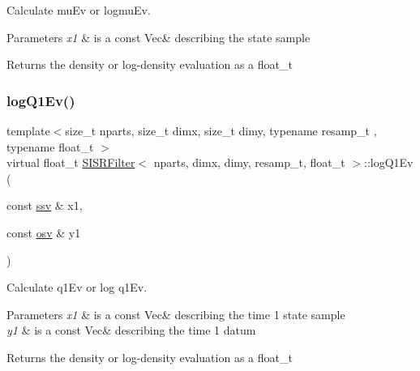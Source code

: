 Calculate mu\+Ev or logmu\+Ev. 


\begin{DoxyParams}{Parameters}
{\em x1} & is a const Vec\& describing the state sample \\
\hline
\end{DoxyParams}
\begin{DoxyReturn}{Returns}
the density or log-\/density evaluation as a float\+\_\+t 
\end{DoxyReturn}
\mbox{\label{classSISRFilter_a21d5130f35d1d5c21b697ca7ea8e9d83}} 
\subsubsection{\texorpdfstring{log\+Q1\+Ev()}{logQ1Ev()}}
{\footnotesize\ttfamily template$<$size\+\_\+t nparts, size\+\_\+t dimx, size\+\_\+t dimy, typename resamp\+\_\+t , typename float\+\_\+t $>$ \\
virtual float\+\_\+t \hyperlink{classSISRFilter}{S\+I\+S\+R\+Filter}$<$ nparts, dimx, dimy, resamp\+\_\+t, float\+\_\+t $>$\+::log\+Q1\+Ev (\begin{DoxyParamCaption}\item[{const \hyperlink{classSISRFilter_abfec45cf57ea6fadae4a9da8b0042351}{ssv} \&}]{x1,  }\item[{const \hyperlink{classSISRFilter_a5b762e9352857a9e48db3932191887ef}{osv} \&}]{y1 }\end{DoxyParamCaption})\hspace{0.3cm}{\ttfamily [pure virtual]}}



Calculate q1\+Ev or log q1\+Ev. 


\begin{DoxyParams}{Parameters}
{\em x1} & is a const Vec\& describing the time 1 state sample \\
\hline
{\em y1} & is a const Vec\& describing the time 1 datum \\
\hline
\end{DoxyParams}
\begin{DoxyReturn}{Returns}
the density or log-\/density evaluation as a float\+\_\+t 
\end{DoxyReturn}
\mbox{\label{classSISRFilter_a4edca9291a3a118c37bd0e41c06fb7da}} 
